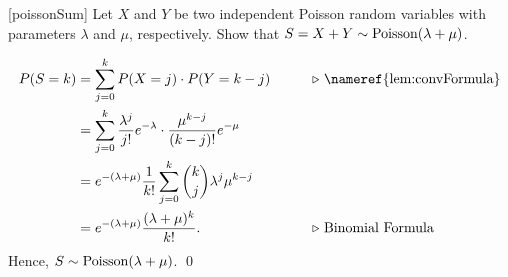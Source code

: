 \documentclass[../probability.tex]{subfiles}
\begin{document}

\begin{Exercise}{}[poissonSum]
    Let \(X\) and \(Y\) be two independent Poisson random variables with parameters \(\lambda\) and
    \(\mu\), respectively. Show that \(S = X + Y \sim \operatorname{Poisson}(\lambda + \mu)\).
\end{Exercise}
\begin{solution}
    \begin{alignat*}{2}
        P(S = k)
        &= \sum_{j=0}^k P(X=j) \cdot P(Y=k-j) &\qquad& \comment{\nameref{lem:convFormula}} \\
        &= \sum_{j=0}^k \frac{\lambda^j}{j!} e^{-\lambda} \cdot \frac{\mu^{k-j}}{(k-j)!} e^{-\mu} \\
        &= e^{-(\lambda+\mu)} \frac{1}{k!} \sum_{j=0}^k \binom{k}{j} \lambda^j \mu^{k-j} \\
        &= e^{-(\lambda+\mu)} \frac{(\lambda+\mu)^k}{k!}\text. && \comment{Binomial Formula}
    \end{alignat*}
    Hence, \(S \sim \operatorname{Poisson}(\lambda+\mu)\). \qed
\end{solution}
\end{document}
